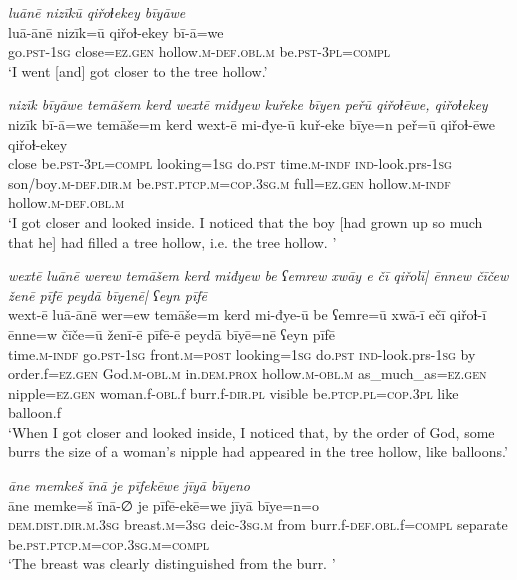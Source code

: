 \ea \label{ZQ.36}
\textit{luānē nizīkū qiřoɫekey bīyāwe} \\ 
\gll luā-ānē nizīk=ū qiřoɫ-ekey bī-ā=we \\ 
 go\textsc{.pst}\textsc{-\textsc{1sg}} close=\textsc{ez.gen} hollow\textsc{.m}\textsc{-def}\textsc{.obl}\textsc{.m} be\textsc{.pst}\textsc{-3pl}\textsc{=compl} \\ 
\glt `I went [and] got closer to the tree hollow.'
\z 
 
\ea \label{ZQ.38}
\textit{nizīk bīyāwe temāšem kerd wextē miđyew kuřeke bīyen peřū qiřoɫēwe, qiřoɫekey} \\ 
\gll nizīk bī-ā=we temāše=m kerd wext-ē mi-đye-ū kuř-eke bīye=n peř=ū qiřoɫ-ēwe qiřoɫ-ekey \\ 
 close be\textsc{.pst}\textsc{-3pl}\textsc{=compl} looking\textsc{=\textsc{1sg}} do\textsc{.pst} time\textsc{.m}\textsc{-indf} \textsc{ind-}look.prs\textsc{-\textsc{1sg}} son/boy\textsc{.m}\textsc{-def}\textsc{.dir}\textsc{.m} be\textsc{.pst}\textsc{.ptcp}\textsc{.m}\textsc{=cop}\textsc{.3sg}\textsc{.m} full\textsc{=ez.gen} hollow\textsc{.m}\textsc{-indf} hollow\textsc{.m}\textsc{-def}\textsc{.obl}\textsc{.m} \\ 
\glt `I got closer and looked inside. I noticed that the boy [had grown up so much that he] had filled a tree hollow, i.e. the tree hollow. '
\z 
 
\ea \label{ZQ.39}
\textit{wextē luānē werew temāšem kerd miđyew be ʕemrew xwāy e čī qiřolī| ēnnew čīčew ženē pīfē peydā bīyenē| ʕeyn pīfē} \\ 
\gll wext-ē luā-ānē wer=ew temāše=m kerd mi-đye-ū be ʕemre=ū xwā-ī ečī qiřoɫ-ī ēnne=w čīče=ū ženī-ē pīfē-ē peydā bīyē=nē ʕeyn pīfē \\ 
 time\textsc{.m}\textsc{-indf} go\textsc{.pst}\textsc{-\textsc{1sg}} front\textsc{.m}\textsc{=\textsc{post}} looking\textsc{=\textsc{1sg}} do\textsc{.pst} \textsc{ind-}look.prs\textsc{-\textsc{1sg}} by order.f\textsc{=ez.gen} God\textsc{.m}\textsc{-obl}\textsc{.m} in.\textsc{dem.prox} hollow\textsc{.m}\textsc{-obl}\textsc{.m} as\_much\_as\textsc{=ez.gen} nipple\textsc{=ez.gen} woman.f\textsc{-obl}.f burr.f\textsc{-dir}\textsc{.pl} visible be\textsc{.ptcp}\textsc{.pl}\textsc{=cop}\textsc{.3pl} like balloon.f \\ 
\glt `When I got closer and looked inside, I noticed that, by the order of God, some burrs the size of a woman's nipple had appeared in the tree hollow, like balloons.'
\z 
 
\ea \label{ZQ.41}
\textit{āne memkeš īnā je pīfekēwe jīyā bīyeno} \\ 
\gll āne memke=š īnā-∅ je pīfē-ekē=we jīyā bīye=n=o \\ 
 \textsc{dem.dist}\textsc{.dir}\textsc{.m}\textsc{.3sg} breast\textsc{.m}\textsc{=3sg} deic\textsc{-3sg}\textsc{.m} from burr.f\textsc{-def}\textsc{.obl}.f\textsc{=compl} separate be\textsc{.pst}\textsc{.ptcp}\textsc{.m}\textsc{=cop}\textsc{.3sg}\textsc{.m}\textsc{=compl} \\ 
\glt `The breast was clearly distinguished from the burr. '
\z 
 
